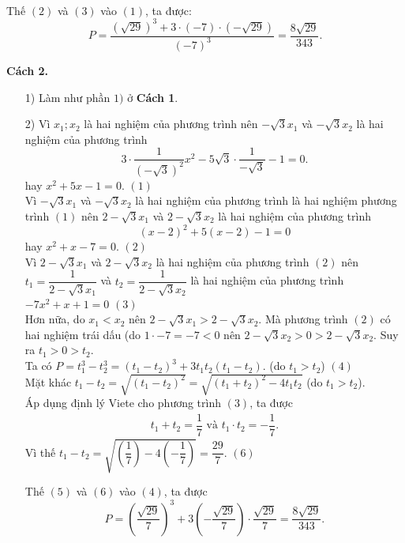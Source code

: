 \begin{bt}
{\begin{itemize}
{\begin{align*}
			\end{align*}}Thế $(2)$ và $(3)$ vào $(1)$, ta được:
			\[P=\dfrac{\left(\sqrt{29}\right)^3+3\cdot(-7)\cdot(-\sqrt{29})}{(-7)^3}=\dfrac{8\sqrt{29}}{343}.\]
		\end{itemize}
		\textbf{Cách 2.}
		\begin{itemize}
			\item[1)] Làm như phần $1)$ ở \textbf{Cách 1}.
			\item[2)] Vì $x_1;x_2$ là hai nghiệm của phương trình nên $-\sqrt{3}x_1$ và $-\sqrt{3}x_2$ là hai nghiệm của phương trình 
			\[3\cdot \dfrac{1}{(-\sqrt{3})^2}x^2-5\sqrt{3}\cdot\dfrac{1}{-\sqrt{3}}-1=0.\]
			hay $x^2+5x-1=0$.\hspace{\fill} $(1)$\\
			Vì $-\sqrt{3}x_1$ và $-\sqrt{3}x_2$ là hai nghiệm của phương trình là hai nghiệm phương trình $(1)$ nên $2-\sqrt{3}x_1$ và $2-\sqrt{3}x_2$ là hai nghiệm của phương trình
			\[(x-2)^2+5(x-2)-1=0\]
			hay $x^2+x-7=0$.\hspace{\fill} $(2)$\\
			Vì $2-\sqrt{3}x_1$ và $2-\sqrt{3}x_2$ là hai nghiệm của phương trình $(2)$ nên $t_1=\dfrac{1}{2-\sqrt{3}x_1}$ và $t_2=\dfrac{1}{2-\sqrt{3}x_2}$ là hai nghiệm của phương trình $-7x^2+x+1=0$ \hspace{\fill} $(3)$\\
			Hơn nữa, do $x_1<x_2$ nên $2-\sqrt{3}x_1>2-\sqrt{3}x_2$. Mà phương trình $(2)$ có hai nghiệm trái dấu (do $1\cdot-7=-7<0$ nên $2-\sqrt{3}x_2>0>2-\sqrt{3}x_2$. Suy ra $t_1>0>t_2$.\\
			Ta có 	$P=t_1^3-t_2^3=(t_1-t_2)^3+3t_1t_2(t_1-t_2).$ (do $t_1>t_2$)\hspace{\fill} $(4)$	\\
			Mặt khác $t_1-t_2=\sqrt{(t_1-t_2)^2}=\sqrt{(t_1+t_2)^2-4t_1t_2}$ (do $t_1>t_2$).\\
			Áp dụng định lý Viete cho phương trình $(3)$, ta được
			\begin{align*}
			t_1+t_2=\dfrac{1}{7}\text{ và }t_1\cdot t_2=-\dfrac{1}{7}. \tag{5}
			\end{align*}
			Vì thế $t_1-t_2=\sqrt{\left(\dfrac{1}{7}\right)-4\left(-\dfrac{1}{7}\right)}=\dfrac{29}{7}.$ \hspace{\fill} $(6)$
			
			Thế $(5)$ và $(6)$ vào $(4)$, ta được
			\[P=\left(\dfrac{\sqrt{29}}{7}\right)^3+3\left(-\dfrac{\sqrt{29}}{7}\right)\cdot\dfrac{\sqrt{29}}{7}=\dfrac{8\sqrt{29}}{343}.\]
			

\end{itemize}}
\end{bt}
